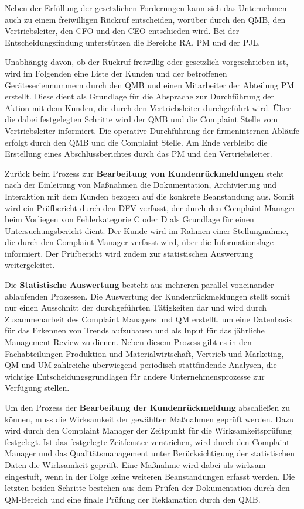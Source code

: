\documentclass[a4paper,12pt]{report}
\begin{document}
Neben der Erfüllung der gesetzlichen Forderungen kann sich das Unternehmen auch zu einem freiwilligen Rückruf entscheiden, worüber durch den QMB, den Vertriebsleiter, den CFO und den CEO entschieden wird. Bei der Entscheidungsfindung unterstützen die Bereiche RA, PM und der PJL.

Unabhängig davon, ob der Rückruf freiwillig oder gesetzlich vorgeschrieben ist, wird im Folgenden eine Liste der Kunden und der betroffenen Geräteseriennummern durch den QMB und einen Mitarbeiter der Abteilung PM erstellt. Diese dient als Grundlage für die Absprache zur Durchführung der Aktion mit dem Kunden, die durch den Vertriebsleiter durchgeführt wird. Über die dabei festgelegten Schritte wird der QMB und die Complaint Stelle vom Vertriebsleiter informiert. Die operative Durchführung der firmeninternen Abläufe erfolgt durch den QMB und die Complaint Stelle. Am Ende verbleibt die Erstellung eines Abschlussberichtes durch das PM und den Vertriebsleiter.

Zurück beim Prozess zur \textbf{Bearbeitung von Kundenrückmeldungen} steht nach der Einleitung von Maßnahmen die Dokumentation, Archivierung und Interaktion mit dem Kunden bezogen auf die konkrete Beanstandung aus. Somit wird ein Prüfbericht durch den DFV verfasst, der durch den Complaint Manager beim Vorliegen von Fehlerkategorie C oder D als Grundlage für einen Untersuchungsbericht dient. Der Kunde wird im Rahmen einer Stellungnahme, die durch den Complaint Manager verfasst wird, über die Informationslage informiert. Der Prüfbericht wird zudem zur statistischen Auswertung weitergeleitet.

Die \textbf{Statistische Auswertung} besteht aus mehreren parallel voneinander ablaufenden Prozessen. Die Auswertung der Kundenrückmeldungen stellt somit nur einen Ausschnitt der durchgeführten Tätigkeiten dar und wird durch Zusammenarbeit des Complaint Managers und QM erstellt, um eine Datenbasis für das Erkennen von Trends aufzubauen und als Input für das jährliche Management Review zu dienen. Neben diesem Prozess gibt es in den Fachabteilungen Produktion und Materialwirtschaft, Vertrieb und Marketing, QM und UM zahlreiche überwiegend periodisch stattfindende Analysen, die wichtige Entscheidungsgrundlagen für andere Unternehmensprozesse zur Verfügung stellen.

Um den Prozess der \textbf{Bearbeitung der Kundenrückmeldung} abschließen zu können, muss die Wirksamkeit der gewählten Maßnahmen geprüft werden. Dazu wird durch den Complaint Manager der Zeitpunkt für die Wirksamkeitsprüfung festgelegt. Ist das festgelegte Zeitfenster verstrichen, wird durch den Complaint Manager und das Qualitätsmanagement unter Berücksichtigung der statistischen Daten die Wirksamkeit geprüft. Eine Maßnahme wird dabei als wirksam eingestuft, wenn in der Folge keine weiteren Beanstandungen erfasst werden. Die letzten beiden Schritte bestehen aus dem Prüfen der Dokumentation durch den QM-Bereich und eine finale Prüfung der Reklamation durch den QMB.
\end{document}

